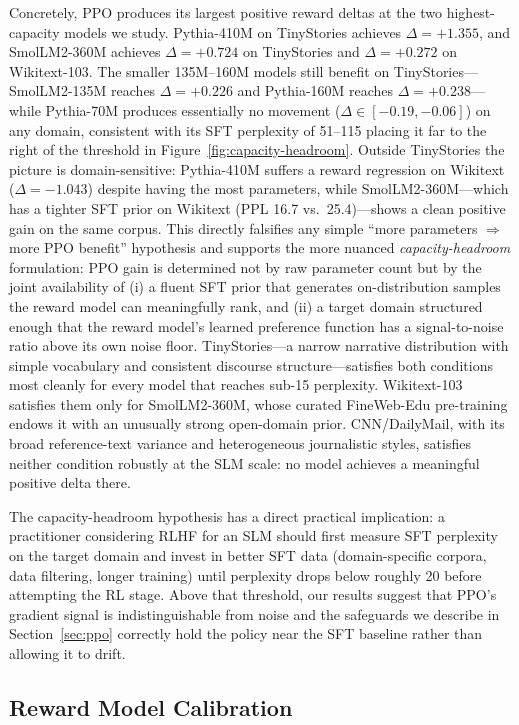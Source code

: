 \documentclass[10pt,twocolumn,letterpaper]{article}
\begin{document}
Concretely, PPO produces its largest positive reward deltas at the two highest-capacity models we study. Pythia-410M on TinyStories achieves $\Delta=+1.355$, and SmolLM2-360M achieves $\Delta=+0.724$ on TinyStories and $\Delta=+0.272$ on Wikitext-103. The smaller 135M--160M models still benefit on TinyStories---SmolLM2-135M reaches $\Delta=+0.226$ and Pythia-160M reaches $\Delta=+0.238$---while Pythia-70M produces essentially no movement ($\Delta \in [-0.19, -0.06]$) on any domain, consistent with its SFT perplexity of 51--115 placing it far to the right of the threshold in Figure~\ref{fig:capacity-headroom}. Outside TinyStories the picture is domain-sensitive: Pythia-410M suffers a reward regression on Wikitext ($\Delta=-1.043$) despite having the most parameters, while SmolLM2-360M---which has a tighter SFT prior on Wikitext (PPL 16.7 vs.\ 25.4)---shows a clean positive gain on the same corpus. This directly falsifies any simple ``more parameters $\Rightarrow$ more PPO benefit'' hypothesis and supports the more nuanced \emph{capacity-headroom} formulation: PPO gain is determined not by raw parameter count but by the joint availability of (i) a fluent SFT prior that generates on-distribution samples the reward model can meaningfully rank, and (ii) a target domain structured enough that the reward model's learned preference function has a signal-to-noise ratio above its own noise floor. TinyStories---a narrow narrative distribution with simple vocabulary and consistent discourse structure---satisfies both conditions most cleanly for every model that reaches sub-15 perplexity. Wikitext-103 satisfies them only for SmolLM2-360M, whose curated FineWeb-Edu pre-training endows it with an unusually strong open-domain prior. CNN/DailyMail, with its broad reference-text variance and heterogeneous journalistic styles, satisfies neither condition robustly at the SLM scale: no model achieves a meaningful positive delta there.

The capacity-headroom hypothesis has a direct practical implication: a practitioner considering RLHF for an SLM should first measure SFT perplexity on the target domain and invest in better SFT data (domain-specific corpora, data filtering, longer training) until perplexity drops below roughly 20 before attempting the RL stage. Above that threshold, our results suggest that PPO's gradient signal is indistinguishable from noise and the safeguards we describe in Section~\ref{sec:ppo} correctly hold the policy near the SFT baseline rather than allowing it to drift.

\subsection{Reward Model Calibration}
\end{document}
